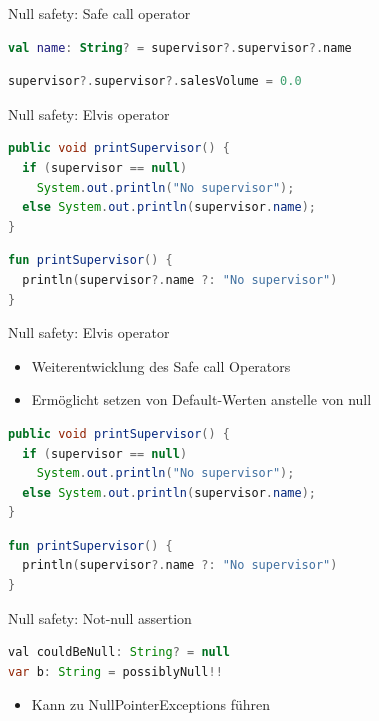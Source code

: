 \documentclass{beamer}
\begin{document}
\begin{frame}[fragile]{Null safety: Safe call operator}
  \begin{lstlisting}[language=Kotlin, title=Verkettung des Operators]
val name: String? = supervisor?.supervisor?.name   
  \end{lstlisting}
  \pause
  \begin{lstlisting}[language=Kotlin, title=Zuweisungen mit dem Operator]
supervisor?.supervisor?.salesVolume = 0.0
  \end{lstlisting}
\end{frame}

\begin{frame}[fragile]{Null safety: Elvis operator}
  \begin{lstlisting}[language=Java]
public void printSupervisor() {
  if (supervisor == null)
    System.out.println("No supervisor");
  else System.out.println(supervisor.name);
}
  \end{lstlisting}
  \pause
  \begin{lstlisting}[language=Kotlin]
fun printSupervisor() {
  println(supervisor?.name ?: "No supervisor")
}
  \end{lstlisting}
\end{frame}

\begin{frame}[fragile]{Null safety: Elvis operator}
  \begin{itemize}[<+->]
    \item Weiterentwicklung des Safe call Operators
    \item Ermöglicht setzen von Default-Werten anstelle von null
  \end{itemize}
  \pause
  \begin{lstlisting}[language=Java]
public void printSupervisor() {
  if (supervisor == null)
    System.out.println("No supervisor");
  else System.out.println(supervisor.name);
}   
  \end{lstlisting}
  \begin{lstlisting}[language=Kotlin]
fun printSupervisor() {
  println(supervisor?.name ?: "No supervisor")
}
  \end{lstlisting}
\end{frame}

\begin{frame}[fragile]{Null safety: Not-null assertion}
  \begin{lstlisting}[language=Java]
val couldBeNull: String? = null
var b: String = possiblyNull!!
  \end{lstlisting}
  \begin{itemize}
    \item Kann zu NullPointerExceptions führen
  \end{itemize}
\end{frame}
\end{document}
